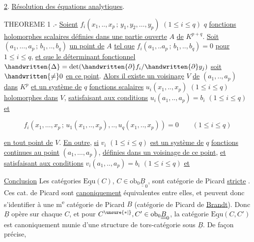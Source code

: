 \uline{2}. \uline{Résolution des équations analytiques}.

THEOREME 1 .- \uline{Soient} $f_i(x_1,..,x_p\,;\,y_1,y_2,\ldots,y_p)$ $(1\leq i\leq q)$ $q$ \uline{fonctions holomorphes scalaires définies dans une partie ouverte} $A$ \uline{de} $K^{p+q}$. \uline{Soit} $(a_1,\ldots,a_p\,;\,b_1,..,b_q)$ \uline{un point de} $A$ \uline{tel que} $f_i(a_1,..a_p\,;\,b_1,..,b_q)=0$ \uline{pour} $1\leq i\leq q$, \uline{et que le déterminant fonctionnel} $\handwritten{\Delta}=\det(\handwritten{\partial} f_i/\handwritten{\partial} y_j)$ \uline{soit} $\handwritten{\ne}0$ \uline{en ce point}. \uline{Alors il existe un voisinage} $V$ \uline{de} $(a_1,..,a_p)$ \uline{dans} $K^p$ \uline{et un système de} $q$ \uline{fonctions scalaires} $u_i(x_1,..,x_p)$ $(1\leq i\leq q)$ \uline{holomorphes dans} $V$, \uline{satisfaisant aux conditions} $u_i(a_1,..,a_p)=b_i$ $(1\leq i\leq q)$ \uline{et}

\[
f_i(x_1,\ldots,x_p\,;\,u_1(x_1,..,x_p),..,u_q(x_1,..,x_p))=0\qquad(1\leq i\leq q)\tag*{(1)}
\]

\uline{en tout point de} $V$. \uline{En outre}, \uline{si} $v_i$ $(1\leq i\leq q)$ \uline{est un système de} $q$ \uline{fonctions continues au point} $(a_1,\ldots,a_p)$, \uline{définies dans un voisinage de ce point}, \uline{et satisfaisant aux conditions} $v_i(a_1,..,a_p)=b_i$ $(1\leq i\leq q)$ \uline{et}







\uline{Conclusion} Les catégories $\underline{\mathrm{Equ}}(C)$, $C\in\mathrm{ob}_0\underline{\underline B}_0$, sont   catégorie de Picard \uline{stricte} .  Ces cat. de Picard sont \uline{canoniquement} équivalentes entre elles, et peuvent donc s'identifier à une m\textsuperscript{e} catégorie de Picard $B$ (catégorie de Picard de \uline{Brandt}). Donc $\underline B$ opère sur chaque $C$, et pour $C^{\unsure{*|{}}},C'\in\mathrm{ob}_0\underline{\underline B}_0$, la catégorie  $\underline{\mathrm{Equ}}(C,C')$ est canoniquement munie d'une structure de tors-catégorie sous $\underline B$. De façon précise,

